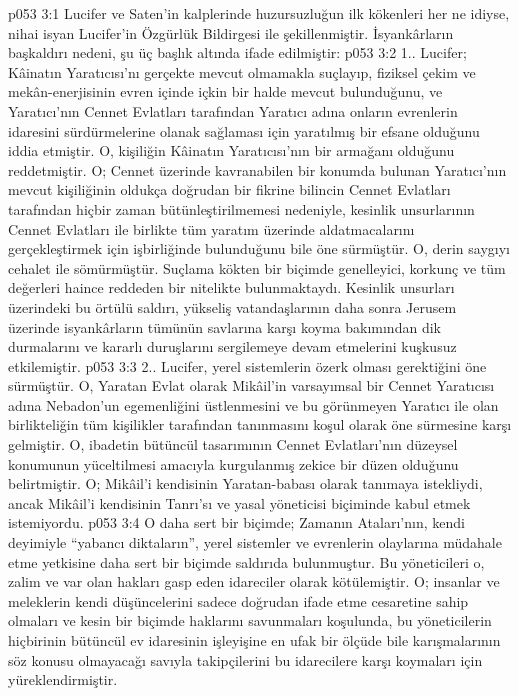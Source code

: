 \vs p053 3:1 Lucifer ve Saten’in kalplerinde huzursuzluğun ilk kökenleri her ne idiyse, nihai isyan Lucifer’in Özgürlük Bildirgesi ile şekillenmiştir. İsyankârların başkaldırı nedeni, şu üç başlık altında ifade edilmiştir:
\vs p053 3:2 1.. Lucifer; Kâinatın Yaratıcısı’nı gerçekte mevcut olmamakla suçlayıp, fiziksel çekim ve mekân\hyp{}enerjisinin evren içinde içkin bir halde mevcut bulunduğunu, ve Yaratıcı’nın Cennet Evlatları tarafından Yaratıcı adına onların evrenlerin idaresini sürdürmelerine olanak sağlaması için yaratılmış bir efsane olduğunu iddia etmiştir. O, kişiliğin Kâinatın Yaratıcısı’nın bir armağanı olduğunu reddetmiştir. O; Cennet üzerinde kavranabilen bir konumda bulunan Yaratıcı’nın mevcut kişiliğinin oldukça doğrudan bir fikrine bilincin Cennet Evlatları tarafından hiçbir zaman bütünleştirilmemesi nedeniyle, kesinlik unsurlarının Cennet Evlatları ile birlikte tüm yaratım üzerinde aldatmacalarını gerçekleştirmek için işbirliğinde bulunduğunu bile öne sürmüştür. O, derin saygıyı cehalet ile sömürmüştür. Suçlama kökten bir biçimde genelleyici, korkunç ve tüm değerleri haince reddeden bir nitelikte bulunmaktaydı. Kesinlik unsurları üzerindeki bu örtülü saldırı, yükseliş vatandaşlarının daha sonra Jerusem üzerinde isyankârların tümünün savlarına karşı koyma bakımından dik durmalarını ve kararlı duruşlarını sergilemeye devam etmelerini kuşkusuz etkilemiştir.
\vs p053 3:3 2.\bibnobreakspace {}. Lucifer, yerel sistemlerin özerk olması gerektiğini öne sürmüştür. O, Yaratan Evlat olarak Mikâil’in varsayımsal bir Cennet Yaratıcısı adına Nebadon’un egemenliğini üstlenmesini ve bu görünmeyen Yaratıcı ile olan birlikteliğin tüm kişilikler tarafından tanınmasını koşul olarak öne sürmesine karşı gelmiştir. O, ibadetin bütüncül tasarımının Cennet Evlatları’nın düzeysel konumunun yüceltilmesi amacıyla kurgulanmış zekice bir düzen olduğunu belirtmiştir. O; Mikâil’i kendisinin Yaratan\hyp{}babası olarak tanımaya istekliydi, ancak Mikâil’i kendisinin Tanrı’sı ve yasal yöneticisi biçiminde kabul etmek istemiyordu.
\vs p053 3:4 O daha sert bir biçimde; Zamanın Ataları’nın, kendi deyimiyle “yabancı diktaların”, yerel sistemler ve evrenlerin olaylarına müdahale etme yetkisine daha sert bir biçimde saldırıda bulunmuştur. Bu yöneticileri o, zalim ve var olan hakları gasp eden idareciler olarak kötülemiştir. O; insanlar ve meleklerin kendi düşüncelerini sadece doğrudan ifade etme cesaretine sahip olmaları ve kesin bir biçimde haklarını savunmaları koşulunda, bu yöneticilerin hiçbirinin bütüncül ev idaresinin işleyişine en ufak bir ölçüde bile karışmalarının söz konusu olmayacağı savıyla takipçilerini bu idarecilere karşı koymaları için yüreklendirmiştir.
